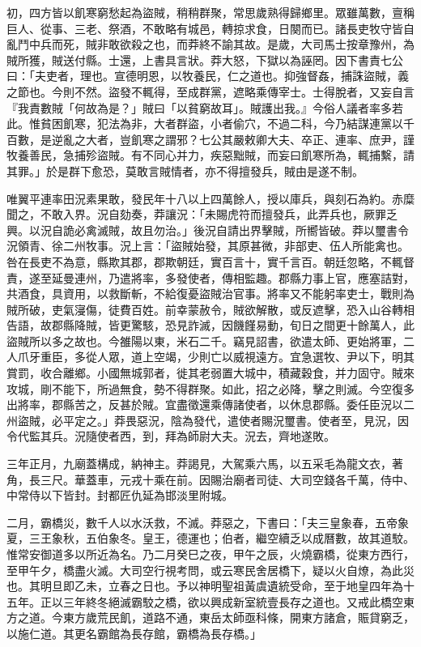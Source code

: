 \begin{pinyinscope}
初，四方皆以飢寒窮愁起為盜賊，稍稍群聚，常思歲熟得歸鄉里。眾雖萬數，亶稱巨人、從事、三老、祭酒，不敢略有城邑，轉掠求食，日闋而已。諸長吏牧守皆自亂鬥中兵而死，賊非敢欲殺之也，而莽終不諭其故。是歲，大司馬士按章豫州，為賊所獲，賊送付縣。士還，上書具言狀。莽大怒，下獄以為誣罔。因下書責七公曰：「夫吏者，理也。宣德明恩，以牧養民，仁之道也。抑強督姦，捕誅盜賊，義之節也。今則不然。盜發不輒得，至成群黨，遮略乘傳宰士。士得脫者，又妄自言『我責數賊「何故為是？」賊曰「以貧窮故耳」。賊護出我。』今俗人議者率多若此。惟貧困飢寒，犯法為非，大者群盜，小者偷穴，不過二科，今乃結謀連黨以千百數，是逆亂之大者，豈飢寒之謂邪？七公其嚴敕卿大夫、卒正、連率、庶尹，謹牧養善民，急捕殄盜賊。有不同心并力，疾惡黜賊，而妄曰飢寒所為，輒捕繫，請其罪。」於是群下愈恐，莫敢言賊情者，亦不得擅發兵，賊由是遂不制。

唯翼平連率田況素果敢，發民年十八以上四萬餘人，授以庫兵，與刻石為約。赤糜聞之，不敢入界。況自劾奏，莽讓況：「未賜虎符而擅發兵，此弄兵也，厥罪乏興。以況自詭必禽滅賊，故且勿治。」後況自請出界擊賊，所嚮皆破。莽以璽書令況領青、徐二州牧事。況上言：「盜賊始發，其原甚微，非部吏、伍人所能禽也。咎在長吏不為意，縣欺其郡，郡欺朝廷，實百言十，實千言百。朝廷忽略，不輒督責，遂至延曼連州，乃遣將率，多發使者，傳相監趣。郡縣力事上官，應塞詰對，共酒食，具資用，以救斷斬，不給復憂盜賊治官事。將率又不能躬率吏士，戰則為賊所破，吏氣寖傷，徒費百姓。前幸蒙赦令，賊欲解散，或反遮擊，恐入山谷轉相告語，故郡縣降賊，皆更驚駭，恐見詐滅，因饑饉易動，旬日之間更十餘萬人，此盜賊所以多之故也。今雒陽以東，米石二千。竊見詔書，欲遣太師、更始將軍，二人爪牙重臣，多從人眾，道上空竭，少則亡以威視遠方。宜急選牧、尹以下，明其賞罰，收合離鄉。小國無城郭者，徙其老弱置大城中，積藏穀食，并力固守。賊來攻城，剛不能下，所過無食，勢不得群聚。如此，招之必降，擊之則滅。今空復多出將率，郡縣苦之，反甚於賊。宜盡徵還乘傳諸使者，以休息郡縣。委任臣況以二州盜賊，必平定之。」莽畏惡況，陰為發代，遣使者賜況璽書。使者至，見況，因令代監其兵。況隨使者西，到，拜為師尉大夫。況去，齊地遂敗。

三年正月，九廟蓋構成，納神主。莽謁見，大駕乘六馬，以五采毛為龍文衣，著角，長三尺。華蓋車，元戎十乘在前。因賜治廟者司徒、大司空錢各千萬，侍中、中常侍以下皆封。封都匠仇延為邯淡里附城。

二月，霸橋災，數千人以水沃救，不滅。莽惡之，下書曰：「夫三皇象春，五帝象夏，三王象秋，五伯象冬。皇王，德運也；伯者，繼空續乏以成曆數，故其道駮。惟常安御道多以所近為名。乃二月癸巳之夜，甲午之辰，火燒霸橋，從東方西行，至甲午夕，橋盡火滅。大司空行視考問，或云寒民舍居橋下，疑以火自燎，為此災也。其明旦即乙未，立春之日也。予以神明聖祖黃虞遺統受命，至于地皇四年為十五年。正以三年終冬絕滅霸駮之橋，欲以興成新室統壹長存之道也。又戒此橋空東方之道。今東方歲荒民飢，道路不通，東岳太師亟科條，開東方諸倉，賑貸窮乏，以施仁道。其更名霸館為長存館，霸橋為長存橋。」


\end{pinyinscope}
